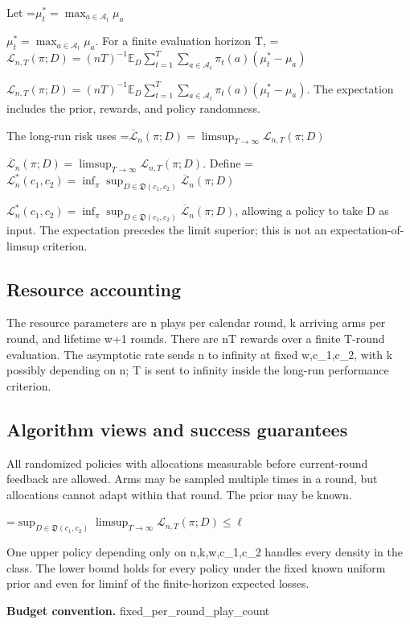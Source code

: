 \documentclass[10pt,a4paper]{article}
\newcommand{\AtlasMath}[1]{\par\begingroup\centering\setbox0=\hbox{$\displaystyle #1$}\ifdim\wd0>1.4\linewidth\typeout{ATLAS WIDE FORMULA: \the\wd0}\fi\ifdim\wd0>\linewidth\resizebox{\linewidth}{!}{\box0}\else\box0\fi\par\endgroup}
\newcommand{\AtlasInlineMath}[1]{\begingroup\setbox0=\hbox{$#1$}\ifdim\wd0>.4\linewidth\endgroup\AtlasMath{#1}\else\endgroup$#1$\fi}
\begin{document}
Let \AtlasInlineMath{\mu_t^*=\max_{a\in\mathcal A_t}\mu_a}. For a finite evaluation horizon T, \AtlasInlineMath{\mathcal L_{n,T}(\pi;D)=(nT)^{-1}\mathbb E_D\sum_{t=1}^T\sum_{a\in\mathcal A_t}\pi_t(a)(\mu_t^*-\mu_a)}. The expectation includes the prior, rewards, and policy randomness.



The long-run risk uses \AtlasInlineMath{\overline{\mathcal L}_n(\pi;D)=\limsup_{T\to\infty}\mathcal L_{n,T}(\pi;D)}. Define \AtlasInlineMath{\mathcal L_n^*(c_1,c_2)=\inf_\pi\sup_{D\in\mathfrak D(c_1,c_2)}\overline{\mathcal L}_n(\pi;D)}, allowing a policy to take D as input. The expectation precedes the limit superior; this is not an expectation-of-limsup criterion.



\subsection{Resource accounting}


The resource parameters are n plays per calendar round, k arriving arms per round, and lifetime w+1 rounds. There are nT rewards over a finite T-round evaluation. The asymptotic rate sends n to infinity at fixed w,c\_1,c\_2, with k possibly depending on n; T is sent to infinity inside the long-run performance criterion.



\subsection{Algorithm views and success guarantees}


All randomized policies with allocations measurable before current-round feedback are allowed. Arms may be sampled multiple times in a round, but allocations cannot adapt within that round. The prior may be known.




\AtlasMath{\sup_{D\in\mathfrak D(c_1,c_2)}\limsup_{T\to\infty}\mathcal L_{n,T}(\pi;D)\le\ell}




One upper policy depending only on n,k,w,c\_1,c\_2 handles every density in the class. The lower bound holds for every policy under the fixed known uniform prior and even for liminf of the finite-horizon expected losses.



\textbf{Budget convention.} fixed\_per\_round\_play\_count
\end{document}
